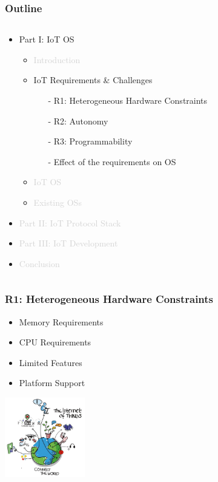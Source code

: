 \documentclass{beamer}
\begin{document}
\begin{frame}
	\frametitle{Outline}
	\begin{columns}[c]
		\begin{column}{30cm}
			\vspace{.1cm}
			\begin{itemize}
				\justifying
				\item Part I: IoT OS
				\begin{itemize}
					\item \textcolor{LightGray}{Introduction}
					\item IoT Requirements \& Challenges
					\begin{itemize}
						\item[-] R1: Heterogeneous Hardware Constraints
						\item[-] R2: Autonomy 
						\item[-] R3: Programmability
						\item[-] Effect of the requirements on OS
					\end{itemize}
					\item \textcolor{LightGray}{IoT OS}
					\item \textcolor{LightGray}{Existing OSs}
				\end{itemize}
				\item \textcolor{LightGray}{Part II: IoT Protocol Stack}
				\item \textcolor{LightGray}{Part III: IoT Development}
				\item \textcolor{LightGray}{Conclusion}
			\end{itemize}
		\end{column}
	\end{columns}
\end{frame}

\begin{frame}
	\frametitle{R1: Heterogeneous Hardware Constraints}
	\begin{itemize}
		\justifying
		\item Memory Requirements
		\item CPU Requirements
		\item Limited Features
		\item Platform Support
	\end{itemize}
	\hspace*{7cm} \includegraphics[width=3.5cm]{figs/Internet-of-Things-3.jpg}
\end{frame}
\end{document}
